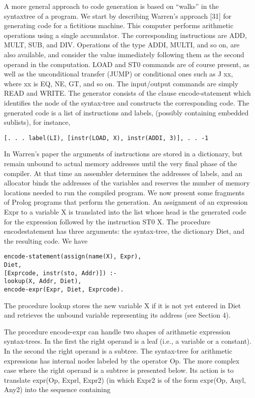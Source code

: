 
A more general approach to code generation is based on “walks” in the syntaxtree
of a program. We start by describing Warren’s approach [31] for generating
code for a fictitious machine. This computer performs arithmetic operations
using a single accumulator. The corresponding instructions are ADD, MULT,
SUB, and DIV. Operations of the type ADDI, MULTI, and so on, are also
available, and consider the value immediately following them as the second
operand in the computation. LOAD and ST0 commands are of course present,
as well as the unconditional transfer (JUMP) or conditional ones such as J xx,
where xx is EQ, NE, GT, and so on. The input/output commands are simply
READ and WRITE. The generator consists of the clause encode-statement which
identifies the node of the syntax-tree and constructs the corresponding code. The
generated code is a list of instructions and labels, (possibly containing embedded
sublists), for instance,
\begin{verbatim}
[. . . label(LI), [instr(LOAD, X), instr(ADDI, 3)], . . -1 
\end{verbatim}

In Warren’s paper the arguments of instructions are stored in a dictionary,
but remain unbound to actual memory addresses until the very final phase of the
compiler. At that time an assembler determines the addresses of labels, and an
allocator binds the addresses of the variables and reserves the number of memory
locations needed to run the compiled program. We now present some fragments
of Prolog programs that perform the generation. An assignment of an expression
Expr to a variable X is translated into the list whose head is the generated code
for the expression followed by the instruction ST0 X. The procedure encodestatement
has three arguments: the syntax-tree, the dictionary Diet, and the
resulting code. We have
\begin{verbatim}
encode-statement(assign(name(X), Expr),
Diet,
[Exprcode, instr(sto, Addr)]) :-
lookup(X, Addr, Diet),
encode-expr(Expr, Diet, Exprcode). 
\end{verbatim}

The procedure lookup stores the new variable X if it is not yet entered in Diet
and retrieves the unbound variable representing its address (see Section 4). 

The procedure encode-expr can handle two shapes of arithmetic expression
syntax-trees. In the first the right operand is a leaf (i.e., a variable or a constant).
In the second the right operand is a subtree. The syntax-tree for arithmetic
expressions has internal nodes labeled by the operator Op. The more complex
case where the right operand is a subtree is presented below. Its action is to
translate expr(Op, Exprl, Expr2) (in which Expr2 is of the form expr(Op, Anyl,
Any2) into the sequence containing

